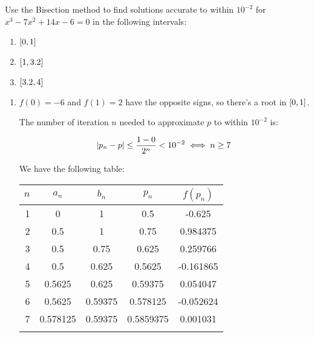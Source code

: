 \documentclass[../../Assignments.tex]{subfiles}
\begin{document}
\begin{exercise}
    Use the Bisection method to find solutions accurate to within \(10^{-2}\)
    for \(x^3 - 7x^2 + 14x - 6 = 0\) in the following intervals:

    \begin{enumerate}[label=(\alph*)]
        \item \(\interval{0}{1}\)
        \item \(\interval{1}{\num{3.2}}\)
        \item \(\interval{\num{3.2}}{4}\)
    \end{enumerate}
\end{exercise}

\begin{solution}
    \begin{enumerate}[label=(\alph*)]
        \item \(f(0) = -6\) and \(f(1) = 2\) have the opposite signs, so there's
            a root in \(\interval{0}{1}\).

            The number of iteration \(n\) needed to approximate \(p\) to within
            \(10^{-2}\) is:

            \[\abs{p_n - p} \leq \frac{1 - 0}{2^n} < 10^{-2} \iff n \geq 7\]

            We have the following table:

            \begin{tabular}{r S[table-format=1.6] S[table-format=1.5] S[table-format=1.7] S[table-format=-1.6]}
                \\
                \toprule
                \(n\)  &  {\(a_n\)}  &  {\(b_n\)}  &  {\(p_n\)}  &  {\(f(p_n)\)}  \\
                  &  0          &  1          &  0.5        &  -0.625        \\
                    2  &  0.5        &  1          &  0.75       &   0.984375     \\
                    3  &  0.5        &  0.75       &  0.625      &   0.259766     \\
                    4  &  0.5        &  0.625      &  0.5625     &  -0.161865     \\
                    5  &  0.5625     &  0.625      &  0.59375    &   0.054047     \\
                    6  &  0.5625     &  0.59375    &  0.578125   &  -0.052624     \\
                    7  &  0.578125   &  0.59375    &  0.5859375  &   0.001031     \\
                \bottomrule
                \\
            \end{tabular}


\end{enumerate}
\end{solution}
\end{document}
